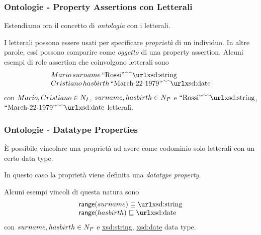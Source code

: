 \documentclass[8pt]{beamer}
\begin{document}
\begin{frame}
\frametitle{Ontologie - Property Assertions con Letterali}

Estendiamo ora il concetto di \emph{ontologia} con i letterali.
\vspace{\baselineskip}

I letterali possono essere usati per specificare \emph{propriet\`a} di un
individuo. In altre parole, essi possono comparire come \emph{oggetto}
di una property assertion. Alcuni esempi di role assertion che coinvolgono
letterali sono
\[
 \begin{array}{l}
  Mario \, surname \, \literal{Rossi}{xsd:string} \\
  Cristiano \, hasbirth \, \literal{March-22-1979}{xsd:date}\\
 \end{array}
\]
con $Mario, Cristiano \in N_I$, $surname, hasbirth \in N_P$ e 
$\literal{Rossi}{xsd:string}$, $\literal{March-22-1979}{xsd:date}$ letterali.

\end{frame}

\begin{frame}
\frametitle{Ontologie - Datatype Properties}
 \`E possibile vincolare una propriet\`a  ad avere come codominio
 solo letterali con un certo data type. 
 \vspace{\baselineskip}
 
 In questo caso la propriet\`a viene definita una \emph{datatype property}. 
 \vspace{\baselineskip}
 
 Alcuni esempi vincoli di questa natura sono
 \[
 \begin{array}{l}
  \range(surname) \Issub \mathurl{xsd:string} \\
  \range(hasbirth) \Issub \mathurl{xsd:date}\\
 \end{array}
\]
con $surname, hasbirth \in N_P$ e 
\url{xsd:string}, \url{xsd:date} data type.
\end{frame}
\end{document}
